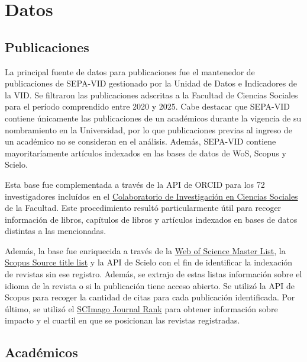 \documentclass[
  a4paper,
  oneside]{scrbook}
\begin{document}
\section{Datos}\label{datos}

\subsection{Publicaciones}\label{publicaciones}

La principal fuente de datos para publicaciones fue el mantenedor de
publicaciones de SEPA-VID gestionado por la Unidad de Datos e
Indicadores de la VID. Se filtraron las publicaciones adscritas a la
Facultad de Ciencias Sociales para el período comprendido entre 2020 y
2025. Cabe destacar que SEPA-VID contiene únicamente las publicaciones
de un académicos durante la vigencia de su nombramiento en la
Universidad, por lo que publicaciones previas al ingreso de un académico
no se consideran en el análisis. Además, SEPA-VID contiene
mayoritaríamente artículos indexados en las bases de datos de WoS,
Scopus y Scielo.

Esta base fue complementada a través de la API de ORCID para los 72
investigadores incluídos en el
\href{https://colaboratoriocienciassociales.uchile.cl/}{Colaboratorio de
Investigación en Ciencias Sociales} de la Facultad. Este procedimiento
resultó particularmente útil para recoger información de libros,
capítulos de libros y artículos indexados en bases de datos distintas a
las mencionadas.

Además, la base fue enriquecida a través de la
\href{https://www.webofscience.com/wos/mjl/collection-list-downloads}{Web
of Science Master List}, la
\href{https://www.elsevier.com/products/scopus/content\#4-titles-on-scopus}{Scopus
Source title list} y la API de Scielo con el fin de identificar la
indexación de revistas sin ese registro. Además, se extrajo de estas
listas información sobre el idioma de la revista o si la publicación
tiene acceso abierto. Se utilizó la API de Scopus para recoger la
cantidad de citas para cada publicación identificada. Por último, se
utilizó el \href{https://www.scimagojr.com/journalrank.php}{SCImago
Journal Rank} para obtener información sobre impacto y el cuartil en que
se posicionan las revistas registradas.

\subsection{Académicos}\label{acaduxe9micos}
\end{document}
